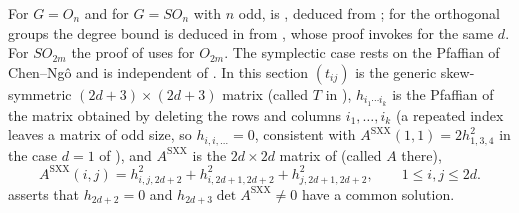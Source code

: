 \documentclass[11pt]{article}
\theoremstyle{definition}
\newcommand{\Asxx}{A^{\mathrm{SXX}}}
\begin{document}
For $G=O_n$ and for $G=SO_n$ with $n$ odd, \cite[Thm.~1.2]{SXX23} is \cite[Thm.~3.4]{SXX23}, deduced from \cite[Prop.~3.1, Lemmas~3.2, 3.3]{SXX23}; for the orthogonal groups the degree bound \cite[Lemma~3.3]{SXX23} is deduced in \cite[\S5.2]{SXX23} from \cite[Lemma~5.3]{SXX23}, whose proof invokes \cite[Lemma~5.2]{SXX23} for the same $d$. For $SO_{2m}$ the proof of \cite[Thm.~4.3]{SXX23} uses \cite[Thm.~3.4]{SXX23} for $O_{2m}$. The symplectic case rests on the Pfaffian of Chen--Ng\^o and is independent of \cite[Lemma~5.2]{SXX23}. In this section $(t_{ij})$ is the generic skew-symmetric $(2d+3)\times(2d+3)$ matrix (called $T$ in \cite{SXX23}), $h_{i_1\cdots i_k}$ is the Pfaffian of the matrix obtained by deleting the rows and columns $i_1,\dots,i_k$ (a repeated index leaves a matrix of odd size, so $h_{i,i,\dots}=0$, consistent with $\Asxx(1,1)=2h^2_{1,3,4}$ in the case $d=1$ of \cite[\S5.2]{SXX23}), and $\Asxx$ is the $2d\times2d$ matrix of \cite[\S5.2]{SXX23} (called $A$ there),
\[
\Asxx(i,j)=h^2_{i,j,2d+2}+h^2_{i,2d+1,2d+2}+h^2_{j,2d+1,2d+2},\qquad 1\le i,j\le2d .
\]
\cite[Lemma~5.2]{SXX23} asserts that $h_{2d+2}=0$ and $h_{2d+3}\det\Asxx\neq0$ have a common solution.
\end{document}
